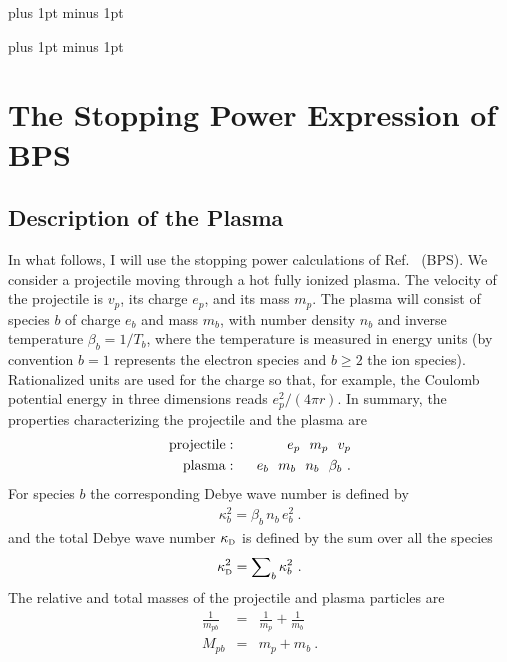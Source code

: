 \documentclass[preprint,12pt,eqsecnum,nofootinbib,amsmath,amssymb]{revtex4}
\newcommand{\smD}{{\rm\scriptscriptstyle D}}
\newcommand{\bodyskip}{\baselineskip 18pt plus 1pt minus 1pt}
\newcommand{\tableofcontentsskip}{\baselineskip 14pt plus 1pt minus 1pt}
\begin{document}

\pagebreak
\tableofcontentsskip
\tableofcontents

\newpage
\bodyskip

\pagebreak
\clearpage

\newpage
\section{The Stopping Power Expression of BPS}

\subsection{Description of the Plasma}

In what follows, I will use the stopping power calculations of
Ref.~\cite{bps} (BPS).  We consider a projectile moving through a hot
fully ionized plasma. The velocity of the projectile is $v_p$, its
charge $e_p$, and its mass $m_p$. The plasma will consist of species
$b$ of charge $e_b$ and mass $m_b$, with number density $n_b$ and
inverse temperature $\beta_b=1/T_b$, where the temperature is measured
in energy units (by convention $b=1$ represents the electron species
and $b \ge 2$ the ion species).  Rationalized units are used for the
charge so that, for example, the Coulomb potential energy in three
dimensions reads $e_p^2 / (4\pi r)$. In summary, the properties
characterizing the projectile and the plasma are
\begin{eqnarray}
  {\rm projectile:} && ~~ e_p ~~ m_p ~~ v_p 
\\
  {\rm plasma:}     && ~~ e_b ~~ m_b ~~ n_b ~~ \beta_b \ .
\end{eqnarray}
For species $b$ the corresponding Debye wave number is defined by
\begin{eqnarray}
  \kappa_b^2 = \beta_b\, n_b \,e_b^2 \ .
\end{eqnarray}
and the total Debye wave number $\kappa_\smD$ is defined by the sum
over all the species
\begin{eqnarray}
  \kappa_\smD^2 = {\sum}_b \, \kappa_b^2 \ .
\end{eqnarray}
The relative and total masses of the projectile and plasma particles
are
\begin{eqnarray}
  \frac{1}{m_{pb} } &=& \frac{1}{m_p } + \frac{1}{m_b } 
\\[5pt]
  M_{pb} &=& m_p + m_b \ .
\end{eqnarray}
\end{document}
